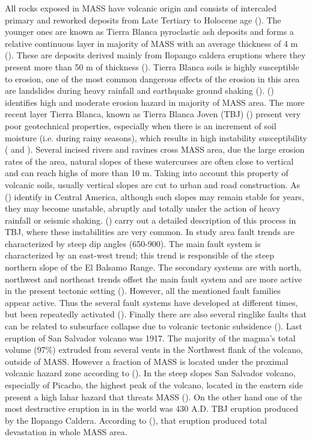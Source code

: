 \documentclass[11pt,twoside]{rmta2010esp}%
\begin{document}
All rocks exposed in MASS have volcanic origin and consists of intercaled primary and reworked deposits from Late Tertiary to Holocene age (\cite{schmidt1975}). The younger ones are known as Tierra Blanca pyroclastic ash deposits and forms a relative continuous layer in majority of MASS with an average thickness of 4 m (\cite{schmidt1975}). These are deposits derived mainly from Ilopango caldera eruptions where they present more than 50 m of thickness (\cite{schmidt1975}). Tierra Blanca soils is highly susceptible to erosion, one of the most common dangerous effects of the erosion in this area are landslides during heavy rainfall and earthquake ground shaking (\cite{schmidt1975}). (\cite{chavez2014a}) identifies high and moderate erosion hazard in majority of MASS area. The more recent layer Tierra Blanca, known as Tierra Blanca Joven (TBJ) (\cite{hernan2004}) present very poor geotechnical properties, especially when there is an increment of soil moisture (i.e. during rainy seasons), which results in high instability susceptibility (\cite{chavez2014b} and \cite{rolo2004}). Several incised rivers and ravines cross MASS area, due the large erosion rates of the area, natural slopes of these watercurses are often close to vertical and can reach highs of more than 10 m. Taking into account this property of volcanic soils, usually vertical slopes are cut to urban and road construction. As (\cite{bommer}) identify in Central America, although such slopes may remain stable for years, they may become unstable, abruptly and totally under the action of heavy rainfall or seismic shaking. (\cite{hernan2004}) carry out a detailed description of this process in TBJ, where these instabilities are very common. 
In study area fault trends are characterized by steep dip angles (650-900). The main fault system is characterized by an east-west trend; this trend is responsible of the steep northern slope of the El Balsamo Range.  The secondary systems are with north, northwest and northeast trends offset the main fault system and are more active in the present tectonic setting (\cite{schmidt1975}). However, all the mentioned fault families appear active. Thus the several fault systems have developed at different times, but been repeatedly activated (\cite{rymer1987}).   Finally there are also several ringlike faults that can be related to subsurface collapse due to volcanic tectonic subsidence (\cite{schmidt1975}).
Last eruption of San Salvador volcano was 1917.  The majority of the magma's total volume (97\%) extruded from several vents in the Northwest flank of the volcano, outside of MASS. However a fraction of MASS is located under the proximal volcanic hazard zone according to (\cite{sofield2004}). In the steep slopes  San Salvador volcano, especially of Picacho, the highest peak of the volcano, located in the eastern side present a high lahar hazard that threats MASS (\cite{major2004}). On the other hand one of the most destructive eruption in in the world was 430 A.D. TBJ eruption produced by the Ilopango Caldera. According to (\cite{dull2004}), that eruption produced total devastation in whole MASS area. 
\end{document}
